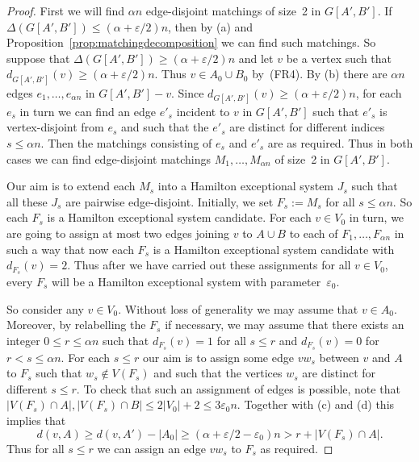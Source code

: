 \documentclass{memo-l}
\def\eps{\varepsilon}
\def\epszero{\eps_0}
\numberwithin{section}{chapter}
\numberwithin{equation}{section}
\numberwithin{firstthm}{section}
\numberwithin{figure}{section}
\begin{document}
\begin{proof}
First we will find $\alpha n$ edge-disjoint matchings of size~2 in $G[A',B']$.
If $\Delta(G[A',B']) \le (\alpha+\eps/2) n$, then by (a) and Proposition~\ref{prop:matchingdecomposition} we can find such matchings.
So suppose that $\Delta(G[A',B']) \ge (\alpha+\eps/2) n$ and let $v$ be a vertex such that $d_{G[A',B']}(v) \ge (\alpha+\eps/2) n$. 
Thus $v\in A_0 \cup B_0$ by~(FR4).
By (b) there are $\alpha n$ edges $e_1,\dots,e_{\alpha n}$ in $G[A',B']-v$. Since $d_{G[A',B']}(v) \ge (\alpha+\eps/2) n$, for each
$e_s$ in turn we can find an edge $e'_s$ incident to $v$ in $G[A',B']$ such that $e'_s$ is vertex-disjoint from $e_s$ and such
that the $e'_s$ are distinct for different indices $s\le \alpha n$. Then the matchings consisting of $e_s$ and $e'_s$ are as required. 
Thus in both cases we can find edge-disjoint matchings $M_1, \dots ,M_{\alpha n }$ of size~2 in $G[A',B']$.

Our aim is to extend each $M_s$ into a Hamilton exceptional system $J_s$ such that all these $J_s$ are pairwise edge-disjoint. 
Initially, we set $F_s:=M_s$ for all $s \le \alpha n$. So each $F_s$ is a Hamilton exceptional system candidate.
For each $v \in V_0$ in turn, we are going to assign at most two edges joining $v$ to $A\cup B$ to each of $F_1, \dots ,F_{\alpha n }$ in such a way
that now each $F_s$ is a Hamilton exceptional system candidate with $d_{F_s}(v) = 2$. Thus after we have carried out these
assignments for all $v\in V_0$, every $F_s$ will be a Hamilton exceptional system with parameter~$\eps_0$.

So consider any $v \in V_0$. Without loss of generality we may assume that $v \in A_0$.
Moreover, by relabelling the $F_s$ if necessary, we may assume that there exists an integer $0\le r \le \alpha n $ such that
$d_{F_s}(v) = 1$ for all $s \le r$ and $d_{F_s}(v) = 0$ for $r < s \le \alpha n$.
For each $s\le r$ our aim is to assign some edge $vw_s$ between $v$ and $A$ to $F_s$ such that $w_s \notin V(F_s)$ and such
that the vertices $w_s$ are distinct for different $s\le r$.
To check that such an assignment of edges is possible, note that $|V(F_s) \cap A|, |V(F_s) \cap B| \le 2|V_0|+2\le 3\eps_0 n$.
Together with (c) and (d) this implies that
$$d(v,A) \ge d(v,A') - |A_0| \ge (\alpha + \eps/2 - \epszero) n > r + |V(F_s) \cap A|.$$
Thus for all $s\le r$ we can assign an edge $vw_s$ to $F_s$ as required. 


\end{proof}
\end{document}
